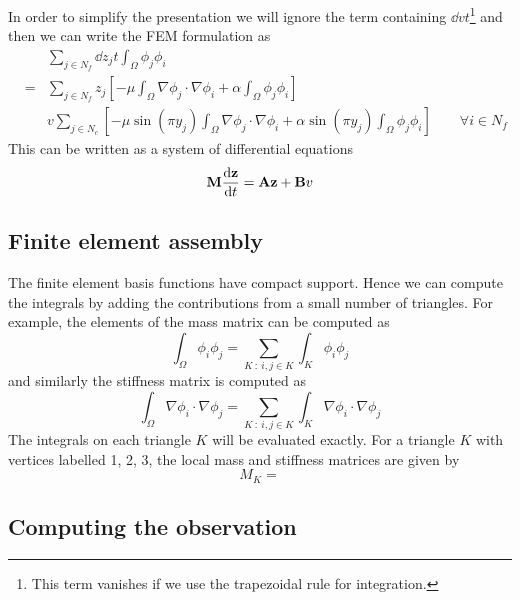 \documentclass[12pt]{article}
\begin{document}
In order to simplify the presentation we will ignore the term containing $\dd{v}{t}$\footnote{This term vanishes if we use the trapezoidal rule for integration.} and then we can write the FEM formulation as
\begin{eqnarray*}
&& \sum_{j \in N_f} \dd{z_j}{t} \int_\Omega \phi_j \phi_i \\
&=&  \sum_{j \in N_f} z_j \left[ -\mu\int_\Omega \nabla \phi_j \cdot \nabla \phi_i + \alpha \int_\Omega \phi_j \phi_i \right] \\
&& v \sum_{j \in N_c} \left[ - \mu  \sin(\pi y_j) \int_\Omega \nabla \phi_j \cdot \nabla \phi_i + \alpha\sin(\pi y_j) \int_\Omega \phi_j \phi_i \right] \qquad \forall i \in N_f
\end{eqnarray*}
This can be written as a system of differential equations
\[
 {\mathbf M} \frac{\textrm{d} {\mathbf z}}{\textrm{d} t} = {\mathbf A} {\mathbf z} + {\mathbf B} v
\]

\subsection{Finite element assembly}
The finite element basis functions have compact support. Hence we can compute the integrals by adding the contributions from a small number of triangles. For example, the elements of the mass matrix can be computed as
\[
\int_\Omega \phi_i \phi_j = \sum_{K \ : \ i, j \in K} \int_K \phi_i \phi_j
\]
and similarly the stiffness matrix is computed as
\[
\int_\Omega \nabla \phi_i \cdot \nabla \phi_j = \sum_{K \ : \ i, j \in K} \int_K \nabla \phi_i \cdot \nabla \phi_j
\]
The integrals on each triangle $K$ will be evaluated exactly. For a triangle $K$ with vertices labelled 1, 2, 3, the local mass and stiffness matrices are given by
\[
M_K =
\]
\subsection{Computing the observation}
\end{document}
